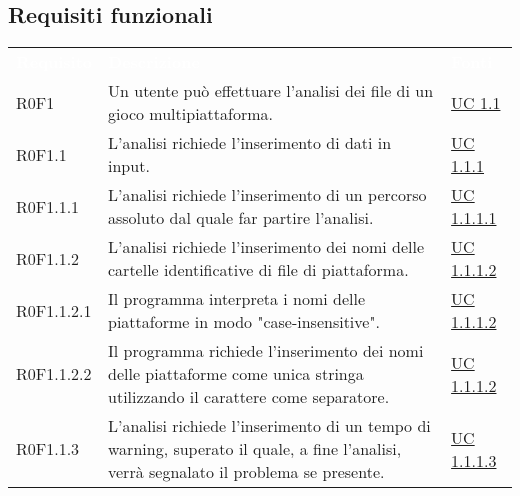 	\subsection{Requisiti funzionali}
		\begin{center}
			\begin{longtable}{p{4.2cm}!{\color{white}\vrule width 0.5mm}p{6cm}!{\color{white}\vrule width 0.5mm}p{2.5cm}!{\color{white}\vrule width 0.5mm}}
				\textcolor{white}{\textbf{Requisito}}&\textcolor{white}{\textbf{Descrizione}}&\textcolor{white}{\textbf{Fonti}}\\
				
				\hspace{0mm}\hypertarget{R0F1}{R0F1}  & Un utente può effettuare l'analisi dei file di un gioco multipiattaforma. & \hyperref[subsec:UC1.1]{UC 1.1}\\
				
				
				\hspace{2mm}\hypertarget{R0F1.1}{R0F1.1}  & L'analisi richiede l'inserimento di dati in input. & \hyperref[subsec:UC1.1.1]{UC 1.1.1}\\
				
				\hspace{4mm}\hypertarget{R0F1.1.1}{R0F1.1.1}  & L'analisi richiede l'inserimento di un percorso assoluto dal quale far partire l'analisi. & \hyperref[subsec:UC1.1.1.1]{UC 1.1.1.1}\\
				
				\hspace{4mm}\hypertarget{R0F1.1.2}{R0F1.1.2}  & L'analisi richiede l'inserimento dei nomi delle cartelle identificative di file di piattaforma. & \hyperref[subsec:UC1.1.1.2]{UC 1.1.1.2}\\
				
				\hspace{6mm}\hypertarget{R0F1.1.2.1}{R0F1.1.2.1}  & Il programma interpreta i nomi delle piattaforme in modo "case-insensitive". & \hyperref[subsec:UC1.1.1.2]{UC 1.1.1.2}\\
				
				\hspace{6mm}\hypertarget{R0F1.1.2.2}{R0F1.1.2.2}  & Il programma richiede l'inserimento dei nomi delle piattaforme come unica stringa utilizzando il carattere \sq{;} come separatore. & \hyperref[subsec:UC1.1.1.2]{UC 1.1.1.2}\\
				
				\hspace{4mm}\hypertarget{R0F1.1.3}{R0F1.1.3}  & L'analisi richiede l'inserimento di un tempo di warning, superato il quale, a fine l'analisi, verrà segnalato il problema se presente. & \hyperref[subsec:UC1.1.1.3]{UC 1.1.1.3}\\
				

\end{longtable}
\end{center}
